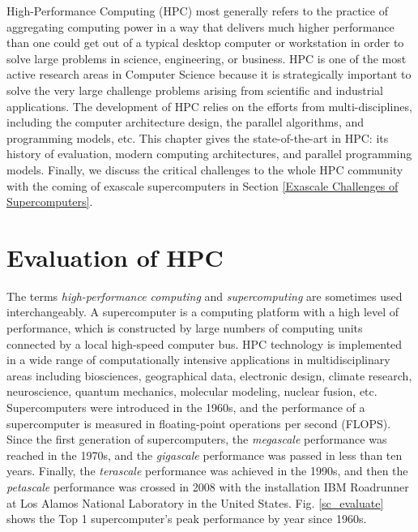 \begin{displayquote}
	\textsf{High-Performance Computing (HPC) most generally refers to the practice of aggregating computing power in a way that delivers much higher performance than one could get out of a typical desktop computer or workstation in order to solve large problems in science, engineering, or business. HPC is one of the most active research areas in Computer Science because it is strategically important to solve the very large challenge problems arising from scientific and industrial applications. The development of HPC relies on the efforts from multi-disciplines, including the computer architecture design, the parallel algorithms, and programming models, etc. This chapter gives the state-of-the-art in HPC: its history of evaluation, modern computing architectures, and parallel programming models. Finally, we discuss the critical challenges to the whole HPC community with the coming of exascale supercomputers in Section \ref{Exascale Challenges of Supercomputers}.}
\end{displayquote}

\vspace{0.6in}

\section{Evaluation of HPC}

The terms \textit{high-performance computing} and \textit{supercomputing} are sometimes used interchangeably. A supercomputer is a computing platform with a high level of performance, which is constructed by large numbers of computing units connected by a local high-speed computer bus. HPC technology is implemented in a wide range of computationally intensive applications in multidisciplinary areas including biosciences, geographical data, electronic design, climate research, neuroscience, quantum mechanics, molecular modeling, nuclear fusion, etc. Supercomputers were introduced in the 1960s, and the performance of a supercomputer is measured in floating-point operations per second (FLOPS). Since the first generation of supercomputers, the \textit{megascale} performance was reached in the 1970s, and the \textit{gigascale} performance was passed in less than ten years. Finally, the \textit{terascale} performance was achieved in the 1990s, and then the \textit{petascale} performance was crossed in 2008 with the installation IBM Roadrunner at Los Alamos National Laboratory in the United States. Fig. \ref{sc_evaluate} shows the Top 1 supercomputer's peak performance by year since 1960s.

